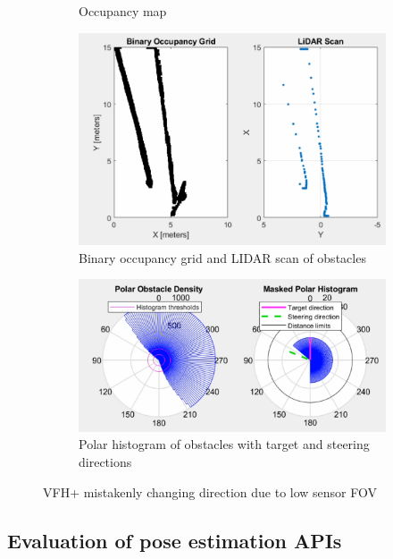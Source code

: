 \begin{figure}[b]
\begin{subfigure}{.3\textwidth}
        \caption{Occupancy map}
    \end{subfigure}
    \begin{subfigure}{.45\textwidth}
        \centering
        \includegraphics[width=\linewidth]{images/vfh_fov_lidar.PNG}
        \caption{Binary occupancy grid and LIDAR scan of obstacles}
    \end{subfigure}
    \quad
    \begin{subfigure}{.45\textwidth}
        \centering
        \includegraphics[width=\linewidth]{images/vfh_fov_hist.PNG}
        \caption{Polar histogram of obstacles with target and steering directions}
    \end{subfigure}
    \caption{VFH+ mistakenly changing direction due to low sensor FOV}
    \label{fig:vfh_mistake}
\end{figure}


\subsection{Evaluation of pose estimation APIs}
